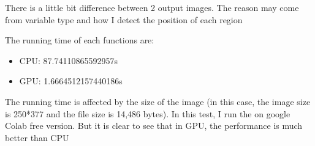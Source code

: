 \documentclass{article}
\begin{document}
    There is a little bit difference between 2 output images. The reason may come from variable type and how I detect the position of each region

    The running time of each functions are:

    \begin{itemize}
        \item CPU: 87.74110865592957s
        \item GPU: 1.6664512157440186s
    \end{itemize}

    
    The running time is affected by the size of the image 
    (in this case, the image size is 250*377  and the file size is 14,486 bytes). In this test, I run the on google Colab free version.
    But it is clear to see that in GPU, the performance is much better than CPU
    
\end{document}
